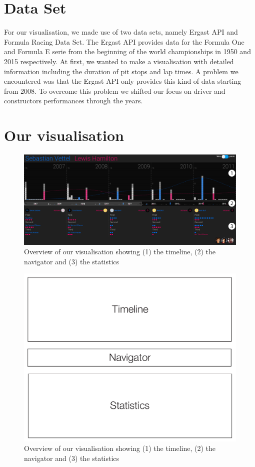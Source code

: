 \documentclass{sigchi}
\begin{document}
\section{Data Set}

For our visualisation, we made use of two data sets, namely Ergast API and Formula Racing Data Set. The Ergast API provides data for the Formula One and Formula E serie from the beginning of the world championships in 1950 and 2015 respectively. At first, we wanted to make a visualisation with detailed information including the duration of pit stops and lap times. A problem we encountered was that the Ergast API only provides this kind of data starting from 2008. To overcome this problem we shifted our focus on driver and constructors performances through the years.

\section{Our visualisation}
\begin{figure}[tp]
  \centering
  \includegraphics[width=1\textwidth]{images/overview.png}
  \caption{Overview of our visualisation showing (1) the timeline, (2) the navigator and (3) the statistics}
  \label{fig:overview}
\end{figure}


\begin{figure}[H]
  \centering
  \includegraphics[width=1\textwidth]{images/layout.pdf}
  \caption{Overview of our visualisation showing (1) the timeline, (2) the navigator and (3) the statistics}
  \label{fig:layout}
\end{figure}
\end{document}
